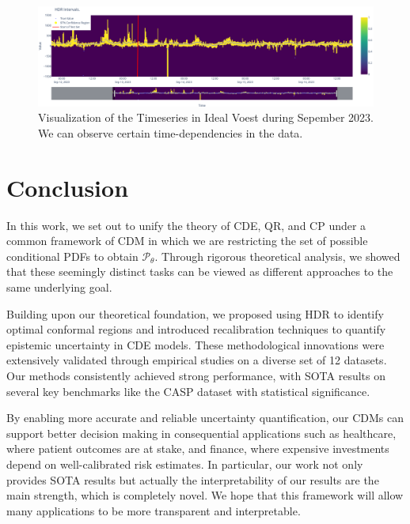 \begin{figure}
    \centering
    \includegraphics[width=1\textwidth]{resources/voest_ideal_test_set.png}
    \caption[Visualization of the Timeseries in Ideal Voest]{Visualization of the Timeseries in Ideal Voest during Sepember 2023. We can observe certain time-dependencies in the data.}\label{fig:voest_ideal_test_set}
\end{figure}

\chapter{Conclusion}\label{chap:conclusion}

In this work, we set out to unify the theory of CDE, QR, and CP under a common framework of CDM in which we are restricting the set of possible conditional PDFs to obtain $\mathscr{P}_\theta$. Through rigorous theoretical analysis, we showed that these seemingly distinct tasks can be viewed as different approaches to the same underlying goal.

Building upon our theoretical foundation, we proposed using HDR to identify optimal conformal regions and introduced recalibration techniques to quantify epistemic uncertainty in CDE models. These methodological innovations were extensively validated through empirical studies on a diverse set of 12 datasets. Our methods consistently achieved strong performance, with SOTA results on several key benchmarks like the CASP dataset with statistical significance.

By enabling more accurate and reliable uncertainty quantification, our CDMs can support better decision making in consequential applications such as healthcare, where patient outcomes are at stake, and finance, where expensive investments depend on well-calibrated risk estimates. In particular, our work not only provides SOTA results but actually the interpretability of our results are the main strength, which is completely novel. We hope that this framework will allow many applications to be more transparent and interpretable.

